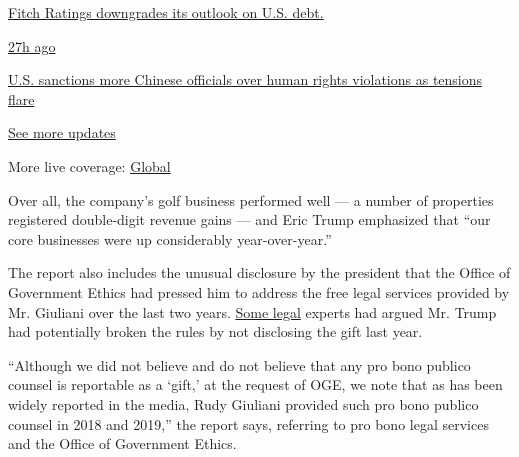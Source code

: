 \href{https://www.nytimes.com/live/2020/07/31/business/stock-market-today-coronavirus?action=click\&pgtype=Article\&state=default\&region=MAIN_CONTENT_1\&context=storylines_live_updates\#fitch-ratings-downgrades-its-outlook-on-us-debt}{Fitch
Ratings downgrades its outlook on U.S. debt.}

\href{https://www.nytimes.com/live/2020/07/31/business/stock-market-today-coronavirus?action=click\&pgtype=Article\&state=default\&region=MAIN_CONTENT_1\&context=storylines_live_updates\#us-sanctions-more-chinese-officials-over-human-rights-violations-as-tensions-flare}{27h
ago}

\href{https://www.nytimes.com/live/2020/07/31/business/stock-market-today-coronavirus?action=click\&pgtype=Article\&state=default\&region=MAIN_CONTENT_1\&context=storylines_live_updates\#us-sanctions-more-chinese-officials-over-human-rights-violations-as-tensions-flare}{U.S.
sanctions more Chinese officials over human rights violations as
tensions flare}

\href{https://www.nytimes.com/live/2020/07/31/business/stock-market-today-coronavirus?action=click\&pgtype=Article\&state=default\&region=MAIN_CONTENT_1\&context=storylines_live_updates}{See
more updates}

More live coverage:
\href{https://www.nytimes.com/2020/08/01/world/coronavirus-covid-19.html?action=click\&pgtype=Article\&state=default\&region=MAIN_CONTENT_1\&context=storylines_live_updates}{Global}

Over all, the company's golf business performed well --- a number of
properties registered double-digit revenue gains --- and Eric Trump
emphasized that ``our core businesses were up considerably
year-over-year.''

The report also includes the unusual disclosure by the president that
the Office of Government Ethics had pressed him to address the free
legal services provided by Mr. Giuliani over the last two years.
\href{https://www.nytimes.com/2019/12/13/us/politics/giuliani-trump-financial-disclosure.html}{Some
legal} experts had argued Mr. Trump had potentially broken the rules by
not disclosing the gift last year.

``Although we did not believe and do not believe that any pro bono
publico counsel is reportable as a `gift,' at the request of OGE, we
note that as has been widely reported in the media, Rudy Giuliani
provided such pro bono publico counsel in 2018 and 2019,'' the report
says, referring to pro bono legal services and the Office of Government
Ethics.

